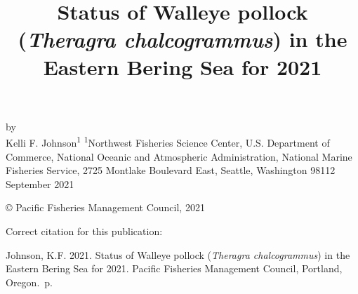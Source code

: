 \documentclass[11pt,
  english,
  a4paper,
]{article}
\date{}
\newcommand{\trTitle}{Status of Walleye pollock (\emph{Theragra chalcogrammus}) in the Eastern Bering Sea for 2021}
\newcommand{\trYear}{2021}
\newcommand{\trMonth}{September}
\newcommand{\trAuthsBack}{Johnson, K.F}
\newcommand{\trCitation}{
\begin{hangparas}{1em}{1}
\trAuthsBack{}. \trYear{}. \trTitle{}. Pacific Fisheries Management Council, Portland, Oregon. \pageref{LastPage}{}\,p.
\end{hangparas}}
\begin{document}

\renewcommand*{\thefootnote}{\fnsymbol{footnote}}

\small
\thispagestyle{empty}
\noindent
\begin{center}
\title{Status of Walleye pollock (\emph{Theragra chalcogrammus}) in the Eastern Bering Sea for 2021}
\vspace{1.5cm}
{\Large\textbf{}}
\vfill
by\\
Kelli F. Johnson\textsuperscript{1}\vfill
\textsuperscript{1}Northwest Fisheries Science Center, U.S. Department of Commerce, National Oceanic and Atmospheric Administration, National Marine Fisheries Service, 2725 Montlake Boulevard East, Seattle, Washington 98112\vfill
\trMonth{} \trYear{}
\end{center}
\clearpage

\thispagestyle{empty}
\vspace*{\fill}
\begin{center}
\copyright{} Pacific Fisheries Management Council, \trYear{}\\
\end{center}
\par
\bigskip
\noindent
Correct citation for this publication:
\bigskip
\par
\trCitation{}
\clearpage


\tableofcontents\clearpage
\listoffigures \listoftables \clearpage
\label{TRlastRoman}
\clearpage

\newpage
\thispagestyle{empty} %

\pagestyle{plain}  %
\renewcommand*{\thefootnote}{\arabic{footnote}}  %
\setcounter{footnote}{0}  %
\renewcommand{\headrulewidth}{0.5pt}
\renewcommand{\footrulewidth}{0.5pt}

\newcommand{\lt}{\ensuremath <}
\newcommand{\gt}{\ensuremath >}
\end{document}
